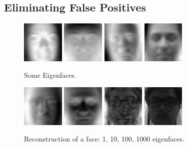 \documentclass[10pt,twocolumn,letterpaper]{article}
\begin{document}
\subsection*{Eliminating False Positives}

\begin{figure}[ht!]
\centering
\includegraphics[width=20mm]{./eigenface/eigenfaces/1.jpg}
\includegraphics[width=20mm]{./eigenface/eigenfaces/2.jpg}
\includegraphics[width=20mm]{./eigenface/eigenfaces/3.jpg}
\includegraphics[width=20mm]{./eigenface/eigenfaces/4.jpg}
\caption{Some Eigenfaces.\label{overflow}}
\end{figure}

\begin{figure}[ht!]
\centering
\includegraphics[width=20mm]{./eigenface/reconstruction/face_proj_1.jpg}
\includegraphics[width=20mm]{./eigenface/reconstruction/face_proj_10.jpg}
\includegraphics[width=20mm]{./eigenface/reconstruction/face_proj_100.jpg}
\includegraphics[width=20mm]{./eigenface/reconstruction/face_proj_1000.jpg}
\caption{Reconstruction of a face: 1, 10, 100, 1000 eigenfaces.\label{overflow}}
\end{figure}
\end{document}
